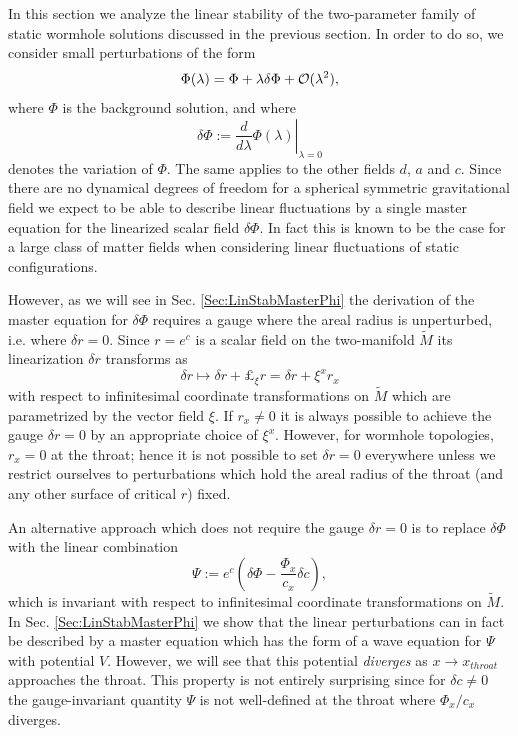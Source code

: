 \documentclass[           %
               showpacs,            %
               preprintnumbers,     %
               aps,                 %
               prd,                 %
               superscriptaddress,      %
               nofootinbib,         %
               tightenlines,        %
               floats,floatfix      %
               ]{revtex4}
\begin{document}
In this section we analyze the linear stability of the two-parameter
family of static wormhole solutions discussed in the previous
section. In order to do so, we consider small perturbations of the
form
\begin{displaymath}
\Phi(\lambda) = \Phi + \lambda\delta\Phi + {\cal O}(\lambda^2),
\end{displaymath}
where $\Phi$ is the background solution, and where
\begin{displaymath}
\delta\Phi := \left. \frac{d}{d\lambda} \Phi(\lambda) \right|_{\lambda=0}
\end{displaymath}
denotes the variation of $\Phi$. The same applies to the other fields
$d$, $a$ and $c$. Since there are no dynamical degrees of freedom for
a spherical symmetric gravitational field we expect to be able to
describe linear fluctuations by a single master equation for the
linearized scalar field $\delta\Phi$. In fact this is known
\cite{oBmHnS96} to be the case for a large class of matter fields when
considering linear fluctuations of static configurations.

However, as we will see in Sec. \ref{Sec:LinStabMasterPhi} the
derivation of the master equation for $\delta\Phi$ requires a gauge
where the areal radius is unperturbed, i.e. where $\delta r =
0$. Since $r = e^c$ is a scalar field on the two-manifold $\tilde{M}$
its linearization $\delta r$ transforms as
\begin{equation}
\delta r \mapsto \delta r + \pounds_\xi r = \delta r + \xi^x r_x
\end{equation}
with respect to infinitesimal coordinate transformations on
$\tilde{M}$ which are parametrized by the vector field $\xi$. If $r_x
\neq 0$ it is always possible to achieve the gauge $\delta r = 0$ by
an appropriate choice of $\xi^x$. However, for wormhole topologies,
$r_x = 0$ at the throat; hence it is not possible to set $\delta r =
0$ everywhere unless we restrict ourselves to perturbations which hold
the areal radius of the throat (and any other surface of critical $r$)
fixed.

An alternative approach which does not require the gauge $\delta r =
0$ is to replace $\delta\Phi$ with the linear combination
\begin{equation}
\Psi := e^c\left( \delta\Phi - \frac{\Phi_x}{c_x} \delta c \right),
\label{Eq:DefPsi}
\end{equation}
which is invariant with respect to infinitesimal coordinate
transformations on $\tilde{M}$. In Sec. \ref{Sec:LinStabMasterPhi} we
show that the linear perturbations can in fact be described by a
master equation which has the form of a wave equation for $\Psi$ with
potential $V$. However, we will see that this potential {\em diverges}
as $x\to x_{throat}$ approaches the throat. This property is not
entirely surprising since for $\delta c \neq 0$ the gauge-invariant
quantity $\Psi$ is not well-defined at the throat where $\Phi_x/c_x$
diverges.
\end{document}
